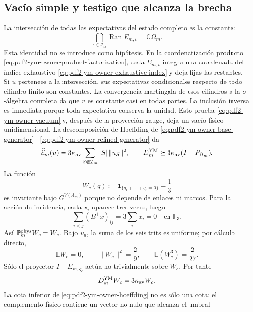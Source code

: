 \subsection{Vacío simple y testigo que alcanza la brecha}

La intersección de todas las expectativas del estado completo es la constante:
\begin{equation}\label{eq:pdf2-ym-owner-vacuum}
 \bigcap_{\iota\in\mathcal I_m}\operatorname{Ran}E_{m,\iota}
 =\mathbb C\Omega_m.
\end{equation}
Esta identidad no se introduce como hipótesis. En la coordenatización producto
\eqref{eq:pdf2-ym-owner-product-factorization}, cada $E_{m,\iota}$ integra una
coordenada del índice exhaustivo
\eqref{eq:pdf2-ym-owner-exhaustive-index} y deja fijas las restantes. Si
$u$ pertenece a la intersección, sus expectativas condicionales respecto de todo
cilindro finito son constantes. La convergencia martingala de esos cilindros a la
$\sigma$-álgebra completa da que $u$ es constante casi en todas partes. La inclusión
inversa es inmediata porque toda expectativa conserva la unidad. Esto prueba
\eqref{eq:pdf2-ym-owner-vacuum} y, después de la proyección gauge, deja un vacío
físico unidimensional.
La descomposición de Hoeffding de
\eqref{eq:pdf2-ym-owner-base-generator}--
\eqref{eq:pdf2-ym-owner-refined-generator} da
\begin{equation}\label{eq:pdf2-ym-owner-hoeffding}
 \widehat{\mathcal E}_m(u)
 =3\kappa_{\rm av}\sum_{S\Subset\mathcal I_m}|S|\,\|u_S\|^2,
 \qquad
 D_m^{\rm YM}\succeq
 3\kappa_{\rm av}(I-P_{\Omega_m}).
\end{equation}
La función
\begin{equation}\label{eq:pdf2-ym-owner-wc}
 W_c(q):=\mathbf1_{\{q_1+\cdots+q_6=0\}}-\frac13
\end{equation}
es invariante bajo $G^{V(\Lambda_m)}$ porque no depende de enlaces ni marcos. Para
la acción de incidencia, cada $x_i$ aparece tres veces, luego
\begin{equation}\label{eq:pdf2-ym-owner-wc-invariance}
 \sum_{i<j}(B^+x)_{ij}=3\sum_i x_i=0
 \quad\text{en }\mathbb F_3.
\end{equation}
Así $\mathbb P_m^{\rm phys}W_c=W_c$. Bajo $u_6$, la suma de los seis trits es
uniforme; por cálculo directo,
\begin{equation}\label{eq:pdf2-ym-owner-wc-moments}
 \mathbb EW_c=0,\qquad
 \|W_c\|^2=\frac29,\qquad
 \mathbb E(W_c^3)=\frac2{27}.
\end{equation}
Sólo el proyector $I-E_{m,q_c}$ actúa no trivialmente sobre $W_c$. Por tanto
\begin{equation}\label{eq:pdf2-ym-owner-wc-eigenvalue}
 D_m^{\rm YM}W_c=3\kappa_{\rm av}W_c.
\end{equation}
La cota inferior de \eqref{eq:pdf2-ym-owner-hoeffding} no es sólo una cota: el
complemento físico contiene un vector no nulo que alcanza el umbral.

